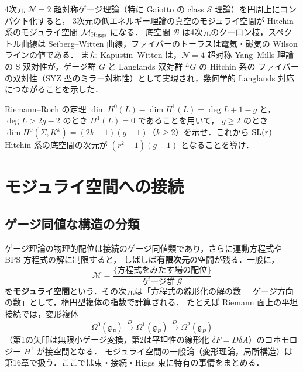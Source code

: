\begin{physbox}
4次元 $\mathcal{N}=2$ 超対称ゲージ理論（特に Gaiotto の class $\mathcal{S}$ 理論）を円周上にコンパクト化すると，
3次元の低エネルギー理論の真空のモジュライ空間が Hitchin 系のモジュライ空間 $\mathcal{M}_{\rm Higgs}$ になる．
底空間 $\mathcal{B}$ は4次元のクーロン枝，スペクトル曲線は Seiberg--Witten 曲線，ファイバーのトーラスは電気・磁気の Wilson ラインの値である．
また Kapustin--Witten は，$\mathcal{N}=4$ 超対称 Yang--Mills 理論の S 双対性が，ゲージ群 $G$ と Langlands 双対群 ${}^LG$ の Hitchin 系の
ファイバーの双対性（SYZ 型のミラー対称性）として実現され，幾何学的 Langlands 対応につながることを示した．
\end{physbox}

Riemann--Roch の定理 $\dim H^0(L)-\dim H^1(L)=\deg L+1-g$ と，$\deg L>2g-2$ のとき $H^1(L)=0$ であることを用いて，
$g\geq2$ のとき $\dim H^0(\Sigma,K^k) = (2k-1)(g-1)$（$k\geq2$）を示せ．これから $\operatorname{SL}(r)$ Hitchin 系の底空間の次元が $(r^2-1)(g-1)$ となることを導け．

\section{モジュライ空間への接続}

\subsection{ゲージ同値な構造の分類}

ゲージ理論の物理的配位は接続のゲージ同値類であり，さらに運動方程式や BPS 方程式の解に制限すると，
しばしば\textbf{有限次元}の空間が残る．一般に，
\begin{equation}
  \mathcal{M} = \frac{\{\text{方程式をみたす場の配位}\}}{\text{ゲージ群}\ \mathcal{G}}
\end{equation}
を\textbf{モジュライ空間}という．その次元は「方程式の線形化の解の数 $-$ ゲージ方向の数」として，楕円型複体の指数で計算される．
たとえば Riemann 面上の平坦接続では，変形複体
\begin{equation}
  \Omega^0(\mathfrak{g}_P)\xrightarrow{\ D\ }\Omega^1(\mathfrak{g}_P)\xrightarrow{\ D\ }\Omega^2(\mathfrak{g}_P)
\end{equation}
（第1の矢印は無限小ゲージ変換，第2は平坦性の線形化 $\delta F = D\delta A$）のコホモロジー $H^1$ が接空間となる．
モジュライ空間の一般論（変形理論，局所構造）は第16章で扱う．ここでは束・接続・Higgs 束に特有の事情をまとめる．

